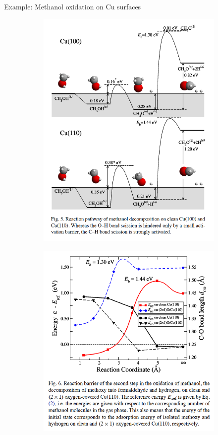 \documentclass[aspectratio=169]{beamer}
\begin{document}
\begin{frame}{Example: Methanol oxidation on Cu surfaces}
\begin{figure}
    \centering
    \begin{subfigure}{0.45\textwidth}
        \centering
        \includegraphics[width=0.65\linewidth]{lectures/figures/12-Methanol_Cu_1.png}
    \end{subfigure}
    \begin{subfigure}{0.45\textwidth}
        \centering
        \includegraphics[width=0.8\linewidth]{lectures/figures/12-Methanol_Cu_2.png}
    \end{subfigure}
    \caption{\cite{sakongDensityFunctionalTheory2005}}
\end{figure} 
\end{frame} 
\end{document}
